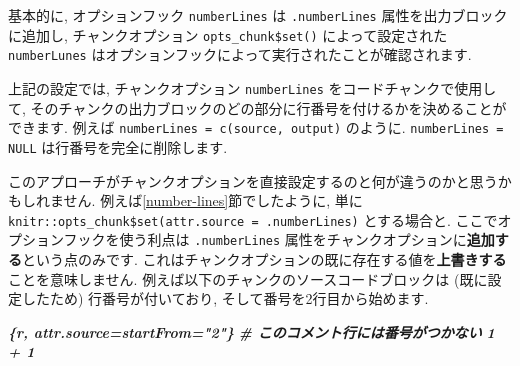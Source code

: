 \documentclass[
  11pt,
]{bxjsreport}
\newenvironment{Shaded}{\begin{snugshade}}{\end{snugshade}}
\newcommand{\AttributeTok}[1]{\textcolor[rgb]{0.77,0.63,0.00}{#1}}
\newcommand{\ControlFlowTok}[1]{\textcolor[rgb]{0.13,0.29,0.53}{\textbf{#1}}}
\newcommand{\FunctionTok}[1]{\textcolor[rgb]{0.00,0.00,0.00}{#1}}
\newcommand{\InformationTok}[1]{\textcolor[rgb]{0.56,0.35,0.01}{\textbf{\textit{#1}}}}
\newcommand{\NormalTok}[1]{#1}
\newcommand{\OtherTok}[1]{\textcolor[rgb]{0.56,0.35,0.01}{#1}}
\newcommand{\SpecialCharTok}[1]{\textcolor[rgb]{0.00,0.00,0.00}{#1}}
\newcommand{\StringTok}[1]{\textcolor[rgb]{0.31,0.60,0.02}{#1}}
\begin{document}
\begin{Shaded}
\end{Shaded}

基本的に, オプションフック \texttt{numberLines} は \texttt{.numberLines} 属性を出力ブロックに追加し, チャンクオプション \texttt{opts\_chunk\$set()} によって設定された \texttt{numberLunes} はオプションフックによって実行されたことが確認されます.

上記の設定では, チャンクオプション \texttt{numberLines} をコードチャンクで使用して, そのチャンクの出力ブロックのどの部分に行番号を付けるかを決めることができます. 例えば \texttt{numberLines = c(\textquotesingle{}source\textquotesingle{},\ \textquotesingle{}output\textquotesingle{})} のように. \texttt{numberLines = NULL} は行番号を完全に削除します.

このアプローチがチャンクオプションを直接設定するのと何が違うのかと思うかもしれません. 例えば\ref{number-lines}節でしたように, 単に \texttt{knitr::opts\_chunk\$set(attr.source = \textquotesingle{}.numberLines\textquotesingle{})} とする場合と. ここでオプションフックを使う利点は \texttt{.numberLines} 属性をチャンクオプションに\textbf{追加する}という点のみです. これはチャンクオプションの既に存在する値を\textbf{上書きする}ことを意味しません. 例えば以下のチャンクのソースコードブロックは (既に設定したため) 行番号が付いており, そして番号を2行目から始めます.

\begin{Shaded}
\begin{Highlighting}[]
\InformationTok{\textasciigrave{}\textasciigrave{}\textasciigrave{}\{r, attr.source=\textquotesingle{}startFrom="2"\textquotesingle{}\}}
\InformationTok{\# このコメント行には番号がつかない}
\InformationTok{1 + 1}
\InformationTok{\textasciigrave{}\textasciigrave{}\textasciigrave{}}
\end{Highlighting}
\end{Shaded}
\end{document}
